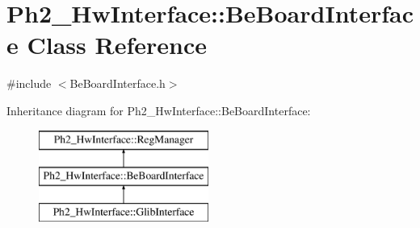 \hypertarget{class_ph2___hw_interface_1_1_be_board_interface}{\section{Ph2\-\_\-\-Hw\-Interface\-:\-:Be\-Board\-Interface Class Reference}
\label{class_ph2___hw_interface_1_1_be_board_interface}
}


{\ttfamily \#include $<$Be\-Board\-Interface.\-h$>$}

Inheritance diagram for Ph2\-\_\-\-Hw\-Interface\-:\-:Be\-Board\-Interface\-:\begin{figure}[H]
\begin{center}
\leavevmode
\includegraphics[height=3.000000cm]{class_ph2___hw_interface_1_1_be_board_interface}
\end{center}
\end{figure}
